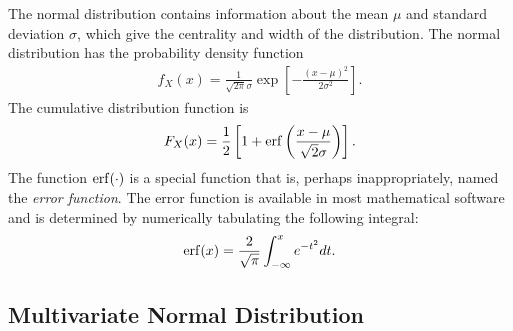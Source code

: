 The normal distribution contains information about the mean $\mu$ and standard deviation $\sigma$, which give the centrality and width of the distribution. The normal distribution has the probability density function
\begin{align}
  f_X(x) = \frac{1}{\sqrt{2\pi}\sigma} \exp \left[ - \frac{ ( x - \mu )^2 }{ 2 \sigma^2 } \right] .
\end{align}
The cumulative distribution function is
\begin{align}
  F_X(x) = \frac{1}{2} \left[ 1 + \mathrm{erf} \left( \frac{ x - \mu }{ \sqrt{2} \sigma } \right) \right] .
\end{align}
The function $\mathrm{erf}(\cdot)$ is a special function that is, perhaps inappropriately, named the \emph{error function}. The error function is available in most mathematical software and is determined by numerically tabulating the following integral:
\begin{align}
  \mathrm{erf} ( x ) = \frac{ 2 }{ \sqrt{ \pi } } \int_{-\infty}^x e^{-t^2} dt .
\end{align}

\subsection{Multivariate Normal Distribution}

